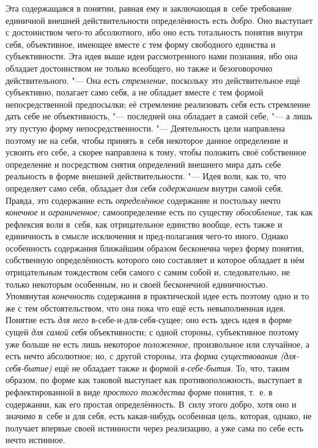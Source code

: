 Эта содержащаяся в понятии, равная ему и заключающая в~себе
требование единичной внешней действительности определённость
есть {\em добро}.
Оно выступает с достоинством чего-то абсолютного, ибо оно
есть тотальность понятия внутри себя, объективное, имеющее вместе с тем
форму свободного единства и субъективности. Эта идея выше идеи
рассмотренного нами познания, ибо она обладает достоинством не только
всеобщего, но также и безоговорочно действительного. "--- Она
есть {\em стремление,}
поскольку это действительное ещё субъективно, полагает само
себя, а не обладает вместе с тем формой непосредственной предпосылки; её
стремление реализовать себя есть стремление дать себе не объективность, "---
последней она обладает в самой себе, "--- а лишь
эту пустую форму непосредственности. "--- Деятельность цели
направлена поэтому не на себя, чтобы принять в~себя некоторое данное
определение и усвоить его себе, а скорее направлена к тому, чтобы положить
своё собственное определение и посредством снятия определений внешнего мира
дать себе реальность в форме внешней действительности. "---
Идея воли, как то, что определяет само себя, обладает
{\em для себя содержанием}
внутри самой себя. Правда, это содержание есть
{\em определённое}
содержание и постольку нечто
{\em конечное} и
{\em ограниченное;}
самоопределение есть по существу
{\em обособление,} так
как рефлексия воли в~себя, как отрицательное единство вообще, есть также и
единичность в смысле исключения и пред-полагания чего-то
иного. Однако особенность содержания ближайшим образом бесконечна через
форму понятия, собственную определённость которого оно составляет и которое
обладает в нём отрицательным тождеством себя самого с самим собой и,
следовательно, не только некоторым особенным, но и своей бесконечной
единичностью. Упомянутая
{\em конечность}
содержания в практической идее есть поэтому одно и то же с
тем обстоятельством, что она пока что ещё есть невыполненная идея. Понятие
есть {\em для него}
в-себе-и-для-себя-сущее; оно есть здесь идея в форме сущей
{\em для самой себя}
объективности; с одной стороны, субъективное поэтому уже
больше не есть лишь некоторое
{\em положенное,}
произвольное или случайное, а есть нечто абсолютное; но, с
другой стороны, эта {\em форма
существования (для-себя-бытие)} ещё не обладает также и
формой {\em в-себе-бытия}.
То, что, таким образом, по форме как таковой выступает как
противоположность, выступает в рефлектированной в виде
{\em простого тождества}
форме понятия, т.~е. в содержании, как его простая
определённость. В~силу этого добро, хотя оно и значимо в~себе и для себя,
есть какая-нибудь особенная цель, которая, однако, не получает впервые
своей истинности через реализацию, а уже сама по себе есть нечто
истинное.

